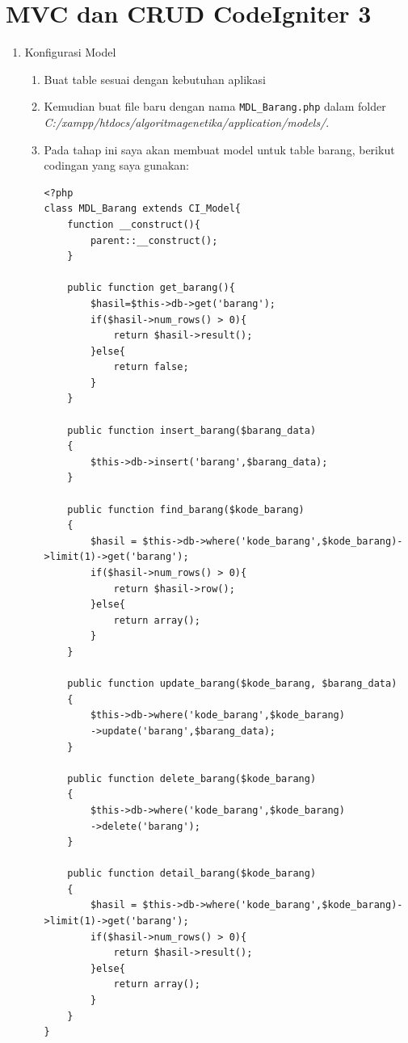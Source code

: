 \section{MVC dan CRUD CodeIgniter 3}
\begin{enumerate}
    \item Konfigurasi Model
    \begin{enumerate}
        \item Buat table sesuai dengan kebutuhan aplikasi
        \item Kemudian buat file baru dengan nama \verb|MDL_Barang.php| dalam folder \textit{C:/xampp/htdocs/algoritmagenetika/application/models/}.
        \item Pada tahap ini saya akan membuat model untuk table barang, berikut codingan yang saya gunakan:
\begin{lstlisting}
<?php
class MDL_Barang extends CI_Model{
	function __construct(){
		parent::__construct();
	}
    
    public function get_barang(){
		$hasil=$this->db->get('barang');
		if($hasil->num_rows() > 0){
			return $hasil->result();
		}else{
			return false;
        }
    }

	public function insert_barang($barang_data)
	{
		$this->db->insert('barang',$barang_data);
	}

	public function find_barang($kode_barang)
	{
		$hasil = $this->db->where('kode_barang',$kode_barang)->limit(1)->get('barang');
		if($hasil->num_rows() > 0){
			return $hasil->row();
		}else{
			return array();
		}
	}

	public function update_barang($kode_barang, $barang_data)
	{
		$this->db->where('kode_barang',$kode_barang)
		->update('barang',$barang_data);	
	}
	
	public function delete_barang($kode_barang)
	{
		$this->db->where('kode_barang',$kode_barang)
		->delete('barang');
	}

	public function detail_barang($kode_barang)
	{
		$hasil = $this->db->where('kode_barang',$kode_barang)->limit(1)->get('barang');
		if($hasil->num_rows() > 0){
			return $hasil->result();
		}else{
			return array();
		}
	}
}
\end{lstlisting}
            

\end{enumerate}
\end{enumerate}
